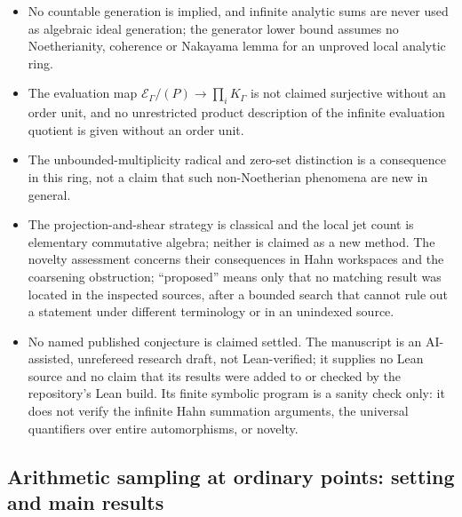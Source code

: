 \documentclass[11pt]{article}
\theoremstyle{plain}
\theoremstyle{plain}
\theoremstyle{plain}
\theoremstyle{definition}
\theoremstyle{definition}
\theoremstyle{definition}
\theoremstyle{definition}
\theoremstyle{remark}
\newcommand{\K}{K_\Gamma}\newcommand{\KD}{K_\Delta}
\newcommand{\E}{\mathcal E_\Gamma}
\newcounter{entrcsaveeq}
\newcounter{entassaveeq}
\begin{document}
\begin{itemize}[leftmargin=1.4em]
image theorem for arbitrary jets.
\item No countable generation is implied, and infinite analytic sums are never
used as algebraic ideal generation; the generator lower bound assumes no
Noetherianity, coherence or Nakayama lemma for an unproved local analytic ring.
\item The evaluation map $\E/(P)\to\prod_i\K$ is not claimed surjective without
an order unit, and no unrestricted product description of the infinite
evaluation quotient is given without an order unit.
\item The unbounded-multiplicity radical and zero-set distinction is a
consequence in this ring, not a claim that such non-Noetherian phenomena are
new in general.
\item The projection-and-shear strategy is classical and the local jet count
is elementary commutative algebra; neither is claimed as a new method. The
novelty assessment concerns their consequences in Hahn workspaces and the
coarsening obstruction; ``proposed'' means only that no matching result was
located in the inspected sources, after a bounded search that cannot rule out
a statement under different terminology or in an unindexed source.
\item No named published conjecture is claimed settled. The manuscript is an
AI-assisted, unrefereed research draft, not Lean-verified; it supplies no Lean
source and no claim that its results were added to or checked by the
repository's Lean build. Its finite symbolic program is a sanity check only:
it does not verify the infinite Hahn summation arguments, the universal
quantifiers over entire automorphisms, or novelty.
\end{itemize}

\setcounter{equation}{\value{entrcsaveeq}}%
\endgroup

\begingroup
\setcounter{entassaveeq}{\value{equation}}%
\setcounter{equation}{0}%
\renewcommand{\theequation}{S\arabic{equation}}%
\renewcommand{\theHequation}{entas.\arabic{equation}}%

\subsection{Arithmetic sampling at ordinary points: setting and main results}
\label{ent:as:subsec:setting}
\end{document}

